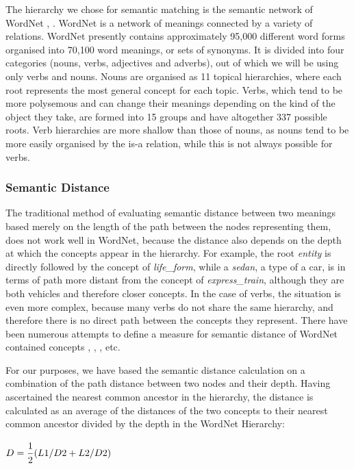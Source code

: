 The hierarchy we chose for semantic matching is the semantic network of WordNet \cite{MI90}, \cite{MI93}. WordNet is a network of meanings connected by a variety of relations. WordNet presently contains approximately 95,000 different word forms organised into 70,100 word meanings, or sets of synonyms. It is divided into four categories (nouns, verbs, adjectives and adverbs), out of which we will be using only verbs and nouns. Nouns are organised as 11 topical hierarchies, where each root represents the most general concept for each topic. Verbs, which tend to be more polysemous and can change their meanings depending on the kind of the object they take, are formed into 15 groups and have altogether 337 possible roots. Verb hierarchies are more shallow than those of nouns, as nouns tend to be more easily organised by the is-a relation, while this is not always possible for verbs. 

\subsubsection{Semantic Distance}

The traditional method of evaluating semantic distance between two meanings based \mbox{merely} on the length of the path between the nodes representing them, does not work well in WordNet, because the distance also depends on the depth at which the concepts appear in the hierarchy. For example, the root {\it entity} is directly followed by the concept of {\it life\_form}, while a {\it sedan}, a type of a car, is in terms of path more distant from the concept of {\it express\_train}, although they are both vehicles and therefore closer concepts. In the case of verbs, the situation is even more complex, because many verbs do not share the same hierarchy, and therefore there is no direct path between the concepts they represent. There have been numerous attempts to define a measure for semantic distance of WordNet contained concepts \cite{RE96}, \cite{SU95}, \cite{SU96}, etc.

For our purposes, we have based the semantic distance calculation on a combination of the path distance between two nodes and their depth. Having ascertained the nearest common ancestor in the hierarchy, the distance is calculated as an average of the distances of the two concepts to their nearest common ancestor divided by the depth in the WordNet Hierarchy:

\begin{center}
$\displaystyle D = \frac{\strut\displaystyle 1}{\strut\displaystyle 2} ( L1/D2 + L2/D2 )$  
\end{center}

